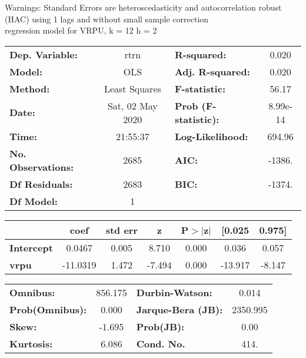 Warnings: \newline
 [1] Standard Errors are heteroscedasticity and autocorrelation robust (HAC) using 1 lags and without small sample correction\\ 

regression model for VRPU, k = 12 h = 2\begin{center}
\begin{tabular}{lclc}
\toprule
\textbf{Dep. Variable:}    &       rtrn       & \textbf{  R-squared:         } &     0.020   \\
\textbf{Model:}            &       OLS        & \textbf{  Adj. R-squared:    } &     0.020   \\
\textbf{Method:}           &  Least Squares   & \textbf{  F-statistic:       } &     56.17   \\
\textbf{Date:}             & Sat, 02 May 2020 & \textbf{  Prob (F-statistic):} &  8.99e-14   \\
\textbf{Time:}             &     21:55:37     & \textbf{  Log-Likelihood:    } &    694.96   \\
\textbf{No. Observations:} &        2685      & \textbf{  AIC:               } &    -1386.   \\
\textbf{Df Residuals:}     &        2683      & \textbf{  BIC:               } &    -1374.   \\
\textbf{Df Model:}         &           1      & \textbf{                     } &             \\
\bottomrule
\end{tabular}
\begin{tabular}{lcccccc}
                   & \textbf{coef} & \textbf{std err} & \textbf{z} & \textbf{P$> |$z$|$} & \textbf{[0.025} & \textbf{0.975]}  \\
\midrule
\textbf{Intercept} &       0.0467  &        0.005     &     8.710  &         0.000        &        0.036    &        0.057     \\
\textbf{vrpu}      &     -11.0319  &        1.472     &    -7.494  &         0.000        &      -13.917    &       -8.147     \\
\bottomrule
\end{tabular}
\begin{tabular}{lclc}
\textbf{Omnibus:}       & 856.175 & \textbf{  Durbin-Watson:     } &    0.014  \\
\textbf{Prob(Omnibus):} &   0.000 & \textbf{  Jarque-Bera (JB):  } & 2350.995  \\
\textbf{Skew:}          &  -1.695 & \textbf{  Prob(JB):          } &     0.00  \\
\textbf{Kurtosis:}      &   6.086 & \textbf{  Cond. No.          } &     414.  \\
\bottomrule
\end{tabular}
\end{center}

